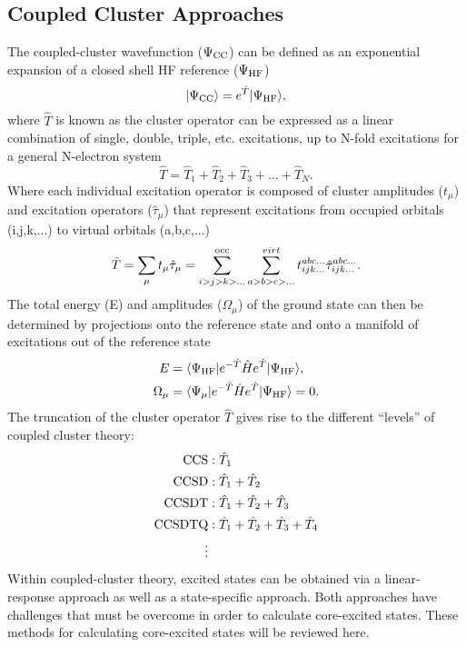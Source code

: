 \documentclass{article}
\begin{document}
\subsection{Coupled Cluster Approaches}
The coupled-cluster wavefunction ($\Psi_{\rm CC}$) can be defined as an exponential expansion of a closed 
shell HF reference ($\Psi_{\rm HF}$)
\begin{equation}
|\Psi_{\rm CC}\rangle = e^{\hat{T}}|\Psi_{\rm HF} \rangle,
\end{equation}
where $\hat{T}$ is known as the cluster operator can be expressed as a linear combination of single, double, triple, etc. excitations, up to N-fold excitations for a general N-electron system
\begin{equation}
\hat{T} = \hat{T}_1 + \hat{T}_2 + \hat{T}_3 + ... + \hat{T}_N.
\end{equation}
Where each individual excitation operator is composed of cluster amplitudes ($t_{\mu}$) and excitation operators ($\hat{\tau}_{\mu}$) that represent excitations from occupied orbitals (i,j,k,...) to virtual orbitals (a,b,c,...)
\begin{equation}
\hat{T} = \sum_{\mu} t_{\mu} \hat{\tau}_{\mu} = \sum^{\rm occ}_{i > j > k> ...} \sum^{virt}_{a > b > c > ...} t^{abc...}_{ijk...} \hat{\tau}^{abc...}_{ijk...}.
\end{equation}
The total energy (E) and amplitudes ($\Omega_{\mu}$) of the ground state can then be determined by projections onto the reference state and onto a manifold of excitations out of the reference state
\begin{align}
E &= \langle \Psi_{\rm HF} | e^{- \hat{T}}\hat{H} e^{\hat{T}} |  \Psi_{\rm HF} \rangle, \\
\Omega_{\mu} &= \langle \Psi_{\mu} | e^{- \hat{T}}\hat{H} e^{\hat{T}} |  \Psi_{\rm HF} \rangle = 0.
\end{align}
The truncation of the cluster operator $\hat{T}$ gives rise to the different ``levels'' of coupled cluster theory:
\begin{align}
{\rm CCS}&: \hat{T}_1 \\
{\rm CCSD}&: \hat{T}_1 + \hat{T}_2 \\
{\rm CCSDT}&: \hat{T}_1 + \hat{T}_2 + \hat{T}_3 \\
{\rm CCSDTQ}&: \hat{T}_1 + \hat{T}_2 + \hat{T}_3 + \hat{T}_4  \\
\nonumber
\vdots
\end{align}
Within coupled-cluster theory, excited states can be obtained via a linear-response approach as well as a state-specific approach. Both approaches have challenges that must be overcome in order to calculate core-excited states. These methods for calculating core-excited states will be reviewed here.
\end{document}
